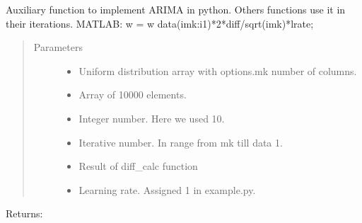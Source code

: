 \documentclass[letterpaper,10pt,english]{sphinxmanual}
\begin{document}
\begin{fulllineitems}
\label{\detokenize{LDS:LDS.OnlineLDS_library.w_calc}}
\sphinxAtStartPar
Auxiliary function to implement ARIMA in python. Others functions use it in their
iterations.
MATLAB: w = w \sphinxhyphen{} data(i\sphinxhyphen{}mk:i\sphinxhyphen{}1)*2*diff/sqrt(i\sphinxhyphen{}mk)*lrate;
\begin{quote}\begin{description}
\item[{Parameters}] \leavevmode\begin{itemize}
\item {} 
\sphinxAtStartPar
{} \textendash{} Uniform distribution array with options.mk number of columns.

\item {} 
\sphinxAtStartPar
{} \textendash{} Array of 10000 elements.

\item {} 
\sphinxAtStartPar
{} \textendash{} Integer number. Here we used 10.

\item {} 
\sphinxAtStartPar
{} \textendash{} Iterative number. In range from mk till data \sphinxhyphen{} 1.

\item {} 
\sphinxAtStartPar
{} \textendash{} Result of diff\_calc function

\item {} 
\sphinxAtStartPar
{} \textendash{} Learning rate. Assigned 1 in example.py.

\end{itemize}

\end{description}\end{quote}

\sphinxAtStartPar
Returns:

\end{fulllineitems}

\end{document}
